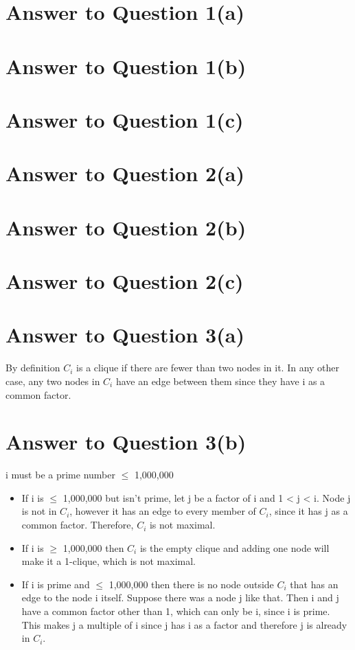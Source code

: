 \documentclass[11pt]{article}
\begin{document}
\pagebreak[4]
\section*{Answer to Question 1(a)}

\section*{Answer to Question 1(b)}

\section*{Answer to Question 1(c)}

\section*{Answer to Question 2(a)}

\section*{Answer to Question 2(b)}

\section*{Answer to Question 2(c)}

\section*{Answer to Question 3(a)}
By definition $C_i$ is a clique if there are fewer than two nodes in it. 
In any other case, any two nodes in $C_i$ have an edge between them since they have i as a common factor.
\section*{Answer to Question 3(b)}
i must be a prime number $\leq$ 1,000,000 
\begin{itemize}
\item If i is $\leq$ 1,000,000 but isn't prime, let j be a factor of i and 
1 < j < i. Node j is not in $C_i$, however it has an edge to every member of $C_i$, since it has j as a common factor. Therefore, $C_i$ is not maximal.
\item If i is $\geq$ 1,000,000  then $C_i$ is the empty clique and adding one node will make it a 1-clique, which is not maximal.
\item If i is prime and $\leq$ 1,000,000 then there is no node outside $C_i$ that has an edge to the node i itself. Suppose there was a node j like that. Then i and j have a common factor other than 1, which can only be i, since i is prime. This makes j a multiple of i since j has i as a factor and therefore j is already in $C_i$.
\end{itemize}
\end{document}
